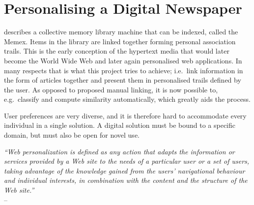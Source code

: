 \section{Personalising a Digital Newspaper}
\cite{BushMemex} describes a collective memory library machine that can be indexed, called the Memex. Items in the library are linked together forming personal association trails. This is the early conception of the hypertext media that would later become the World Wide Web and later again personalised web applications. In many respects that is what this project tries to achieve; i.e.\ link information in the form of articles together and present them in personalised trails defined by the user. As opposed to \cite{BushMemex} proposed manual linking, it is now possible to, e.g.\ classify and compute similarity automatically, which greatly aids the process. 

User preferences are very diverse, and it is therefore hard to accommodate every individual in a single solution. A digital solution must be bound to a specific domain, but must also be open for novel use.

\begin{flushleft}{\slshape
``Web personalization is defined as any action that adapts the information or services provided by a Web site to the needs of a particular user or a set of users, taking advantage of the knowledge gained from the users' navigational behaviour and individual interests, in combination with the content and the structure of the Web site.''} \\ \medskip
-- \cite{MagdaliniWebMining}
\end{flushleft}
	

